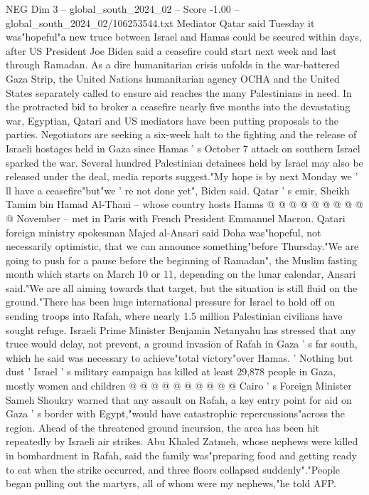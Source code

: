 \begin{textsample}{NEG Dim 3 – global\_south\_2024\_02 – Score -1.00 – global\_south\_2024\_02/106253544.txt}  \label{ex:f3_neg_092}
Mediator Qatar said Tuesday it was"hopeful"a new truce between Israel and Hamas could be secured within days, after US President Joe Biden said a ceasefire could start next week and last through Ramadan.
As a dire humanitarian crisis unfolds in the war-battered Gaza Strip, the United Nations humanitarian agency OCHA and the United States separately called to ensure aid reaches the many Palestinians in need.
In the protracted bid to broker a ceasefire nearly five months into the devastating war, Egyptian, Qatari and US mediators have been putting proposals to the parties.
Negotiators are seeking a six-week halt to the fighting and the release of Israeli hostages held in Gaza since Hamas ' s October 7 attack on southern Israel sparked the war.
Several hundred Palestinian detainees held by Israel may also be released under the deal, media reports suggest."My hope is by next Monday we ' ll have a ceasefire"but"we ' re not done yet", Biden said.
Qatar ' s emir, Sheikh Tamim bin Hamad Al-Thani -- whose country hosts Hamas @ @ @ @ @ @ @ @ @ @ November -- met in Paris with French President Emmanuel Macron.
Qatari foreign ministry spokesman Majed al-Ansari said Doha was"hopeful, not necessarily optimistic, that we can announce something"before Thursday."We are going to push for a pause before the beginning of Ramadan", the Muslim fasting month which starts on March 10 or 11, depending on the lunar calendar, Ansari said."We are all aiming towards that target, but the situation is still fluid on the ground."There has been huge international pressure for Israel to hold off on sending troops into Rafah, where nearly 1.5 million Palestinian civilians have sought refuge.
Israeli Prime Minister Benjamin Netanyahu has stressed that any truce would delay, not prevent, a ground invasion of Rafah in Gaza ' s far south, which he said was necessary to achieve"total victory"over Hamas. ' Nothing but dust ' Israel ' s military campaign has killed at least 29,878 people in Gaza, mostly women and children @ @ @ @ @ @ @ @ @ @ Cairo ' s Foreign Minister Sameh Shoukry warned that any assault on Rafah, a key entry point for aid on Gaza ' s border with Egypt,"would have catastrophic repercussions"across the region.
Ahead of the threatened ground incursion, the area has been hit repeatedly by Israeli air strikes.
Abu Khaled Zatmeh, whose nephews were killed in bombardment in Rafah, said the family was"preparing food and getting ready to eat when the strike occurred, and three floors collapsed suddenly"."People began pulling out the martyrs, all of whom were my nephews,"he told AFP.

\end{textsample}
